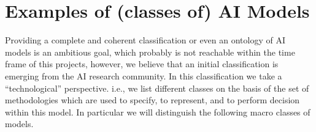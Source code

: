 \section{Examples of (classes of) AI Models}

Providing a complete and coherent classification or even an ontology
of AI models is an ambitious goal, which probably is not reachable
within the time frame of this projects, however, we believe that an
initial classification is emerging from the AI research community. In
this classification we take a ``technological'' perspective. i.e., we
list different classes on the basis of the set of methodologies which
are used to specify, to represent, and to perform decision within this
model. In particular we will distinguish the following macro classes
of models.


